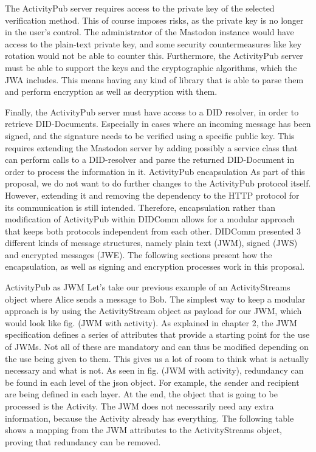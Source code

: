 The ActivityPub server requires access to the private key of the selected verification method. This of course imposes risks, as the private key is no longer in the user’s control. The administrator of the Mastodon instance would have access to the plain-text private key, and some security countermeasures like key rotation would not be able to counter this. Furthermore, the ActivityPub server must be able to support the keys and the cryptographic algorithms, which the JWA includes. This means having any kind of library that is able to parse them and perform encryption as well as decryption with them. 

Finally, the ActivityPub server must have access to a DID resolver, in order to retrieve DID-Documents. Especially in cases where an incoming message has been signed, and the signature needs to be verified using a specific public key. This requires extending the Mastodon server by adding possibly a service class that can perform calls to a DID-resolver and parse the returned DID-Document in order to process the information in it. 
ActivityPub encapsulation
As part of this proposal, we do not want to do further changes to the ActivityPub protocol itself. However, extending it and removing the dependency to the HTTP protocol for its communication is still intended. Therefore, encapsulation rather than modification of ActivityPub within DIDComm allows for a modular approach that keeps both protocols independent from each other. DIDComm presented 3 different kinds of message structures, namely plain text (JWM), signed (JWS) and encrypted messages (JWE). The following sections present how the encapsulation, as well as signing and encryption processes work in this proposal.

ActivityPub as JWM
Let’s take our previous example of an ActivityStreams object where Alice sends a message to Bob. The simplest way to keep a modular approach is by using the ActivityStream object as payload for our JWM, which would look like fig. (JWM with activity). As explained in chapter 2, the JWM specification defines a series of attributes that provide a starting point for the use of JWMs. Not all of these are mandatory and can thus be modified depending on the use being given to them. This gives us a lot of room to think what is actually necessary and what is not. As seen in fig. (JWM with activity), redundancy can be found in each level of the json object. For example, the sender and recipient are being defined in each layer. At the end, the object that is going to be processed is the Activity. The JWM does not necessarily need any extra information, because the Activity already has everything. The following table shows a mapping from the JWM attributes to the ActivityStreams object, proving that redundancy can be removed. 

